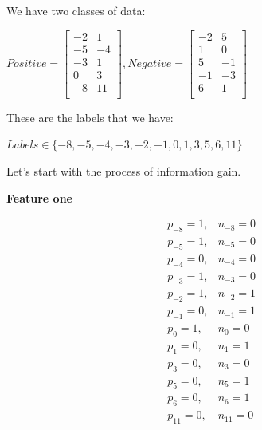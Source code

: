 \documentclass[12pt]{article}
\begin{document}
We have two classes of data:
\begin{center}
    $
    Positive =
    \begin{bmatrix}
        -2 & 1\\
        -5 & -4\\
        -3 & 1\\
        0 & 3\\
        -8 & 11\\
    \end{bmatrix}
    , Negative =
    \begin{bmatrix}
        -2 & 5\\
        1 & 0\\
        5 & -1\\
        -1 & -3\\
        6 & 1\\
    \end{bmatrix}
    $
    \\[0.1 in]
\end{center}

These are the labels that we have:
\begin{center}
    $
    Labels\in\{-8, -5,-4,-3,-2,-1,0,1,3,5,6,11\}
    $
    \\[0.1 in]
\end{center}
\noindent
Let's start with the process of information gain.

\noindent
\textbf{Feature one}
\begin{center}
    
    \begin{align*}
        &p_{-8}=1, &n_{-8}=0\\
        &p_{-5}=1, &n_{-5}=0\\
        &p_{-4}=0, &n_{-4}=0\\
        &p_{-3}=1, &n_{-3}=0\\
        &p_{-2}=1, &n_{-2}=1\\
        &p_{-1}=0, &n_{-1}=1\\
        &p_{0}=1, &n_{0}=0\\
        &p_{1}=0, &n_{1}=1\\
        &p_{3}=0, &n_{3}=0\\
        &p_{5}=0, &n_{5}=1\\
        &p_{6}=0, &n_{6}=1\\
        &p_{11}=0, &n_{11}=0\\
    \end{align*}
    \\[0.1 in]
\end{center}
\end{document}
